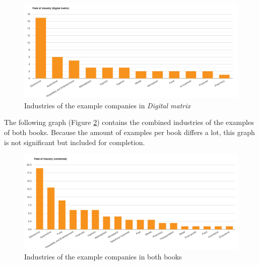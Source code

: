 \documentclass[a4]{scrartcl}
\begin{document}
\begin{figure}[h!]
	\centering
	\includegraphics[width=1\textwidth]{images/MD_graph_i.png}
	\caption{Industries of the example companies in \textit{Digital matrix} \cite{digitalmatrix}}
	\label{fig:DM_graph_i}
\end{figure}



The following graph (Figure \ref{fig:C_graph_i}) contains the combined industries of the examples of both books. Because the amount of examples per book differs a lot, this graph is not significant but included for completion. \cite{digitalmatrix, leadingdigital}


\begin{figure}[h!]
	\centering
	\includegraphics[width=1\textwidth]{images/combi_graph_i.png}
	\caption{Industries of the example companies in both books \cite{digitalmatrix, leadingdigital}}
	\label{fig:C_graph_i}
\end{figure}






\end{document}
